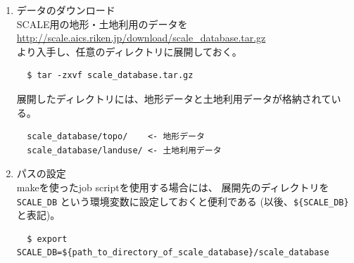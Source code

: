 \begin{enumerate}
\item データのダウンロード\\
SCALE用の地形・土地利用のデータを\\
 \url{http://scale.aics.riken.jp/download/scale_database.tar.gz}\\
より入手し、任意のディレクトリに展開しておく。
\begin{verbatim}
  $ tar -zxvf scale_database.tar.gz
\end{verbatim}
展開したディレクトリには、地形データと土地利用データが格納されている。
\begin{verbatim}
  scale_database/topo/    <- 地形データ
  scale_database/landuse/ <- 土地利用データ
\end{verbatim}

\item パスの設定\\
makeを使ったjob scriptを使用する場合には、
展開先のディレクトリを \verb|SCALE_DB| という環境変数に設定しておくと便利である
(以後、\verb|${SCALE_DB}|と表記)。
\begin{verbatim}
  $ export SCALE_DB=${path_to_directory_of_scale_database}/scale_database
\end{verbatim}
\end{enumerate}

